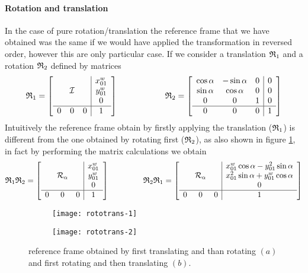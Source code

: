 		\paragraph{Rotation and translation} In the case of pure rotation/translation the reference frame that we have obtained was the same if we would have applied the transformation in reversed order, however this are only particular case. If we consider a translation $\mathfrak {R}_{1}$ and a rotation $\mathfrak {R}_{2}$ defined by matrices
		\[  \mathfrak {R}_{1} = \begin{bmatrix}  \begin{array}{c c c | c}  &&& x_{01}^w \\ & \mathcal I&& y_{01}^w \\ &&& 0 \\ \hline 0 & 0 & 0 & 1  \end{array} \end{bmatrix}  \hspace{2cm} \mathfrak {R}_{2} = \begin{bmatrix}  \begin{array}{c c c | c} \cos \alpha & -\sin \alpha & 0 & 0 \\ \sin\alpha & \cos \alpha & 0 & 0 \\ 0 & 0 & 1 & 0 \\ \hline 0 & 0 & 0 & 1 \end{array} \end{bmatrix} \]
		Intuitively the reference frame obtain by firstly applying the translation ($\mathfrak {R}_{1}$) is different from the one obtained by rotating first ($\mathfrak {R}_{2}$), as also shown in figure \ref{fig:kin:transforder}, in fact by performing the matrix calculations we obtain
		\[ \mathfrak {R}_{1} \mathfrak {R}_{2} = \begin{bmatrix}  \begin{array}{c c c | c}  &&& x_{01}^w \\ &\mathcal R_\alpha && y_{01}^w \\ &&& 0 \\ \hline 0&0&0& 1 \end{array} \end{bmatrix} \hspace{1.5cm} \mathfrak {R}_{2} \mathfrak {R}_{1}  = \begin{bmatrix}  \begin{array}{c c c | c}  &&& x_{01}^w \cos\alpha  - y_{01}^2 \sin\alpha \\ &\mathcal R_\alpha && x_{01}^2 \sin\alpha + y_{01}^w \cos\alpha \\ &&& 0 \\ \hline 0&0&0& 1 \end{array} \end{bmatrix}  \]
				
		\begin{figure}[bht]
			\centering 
			\begin{subfigure}{0.48\linewidth}
				\centering \texttt{[image: rototrans-1]} \caption{}
			\end{subfigure}
			\begin{subfigure}{0.48\linewidth}
				\centering \texttt{[image: rototrans-2]} \caption{}
			\end{subfigure}
			\caption{reference frame obtained by first translating and than rotating $(a)$ and first rotating and then translating $(b)$.} \label{fig:kin:transforder}
		\end{figure}
	
